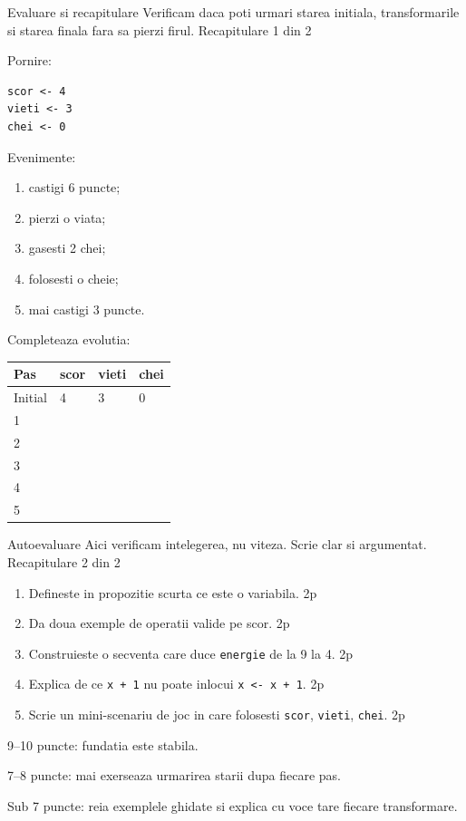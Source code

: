 \PageHeader
  {Evaluare si recapitulare}
  {Verificam daca poti urmari starea initiala, transformarile si starea finala fara sa pierzi firul.}
  {Recapitulare 1 din 2}

\begin{missionbox}
Pornire:
\begin{lstlisting}[style=codequest]
scor <- 4
vieti <- 3
chei <- 0
\end{lstlisting}
Evenimente:
\begin{enumerate}
\item castigi 6 puncte;
\item pierzi o viata;
\item gasesti 2 chei;
\item folosesti o cheie;
\item mai castigi 3 puncte.
\end{enumerate}
\end{missionbox}

\begin{guidebox}
Completeaza evolutia:
\begin{center}
\begin{tabular}{llll}
\toprule
Pas & scor & vieti & chei \\
\midrule
Initial & 4 & 3 & 0 \\
1 & & & \\
2 & & & \\
3 & & & \\
4 & & & \\
5 & & & \\
\bottomrule
\end{tabular}
\end{center}
\end{guidebox}

\clearpage

\PageHeader
  {Autoevaluare}
  {Aici verificam intelegerea, nu viteza. Scrie clar si argumentat.}
  {Recapitulare 2 din 2}

\begin{solobox}
\begin{enumerate}
\item Defineste in propozitie scurta ce este o variabila. \hfill 2p
\item Da doua exemple de operatii valide pe scor. \hfill 2p
\item Construieste o secventa care duce \texttt{energie} de la 9 la 4. \hfill 2p
\item Explica de ce \texttt{x + 1} nu poate inlocui \texttt{x <- x + 1}. \hfill 2p
\item Scrie un mini-scenariu de joc in care folosesti \texttt{scor}, \texttt{vieti}, \texttt{chei}. \hfill 2p
\end{enumerate}
\end{solobox}

\begin{conceptbox}
9--10 puncte: fundatia este stabila.

7--8 puncte: mai exerseaza urmarirea starii dupa fiecare pas.

Sub 7 puncte: reia exemplele ghidate si explica cu voce tare fiecare transformare.
\end{conceptbox}

\clearpage
